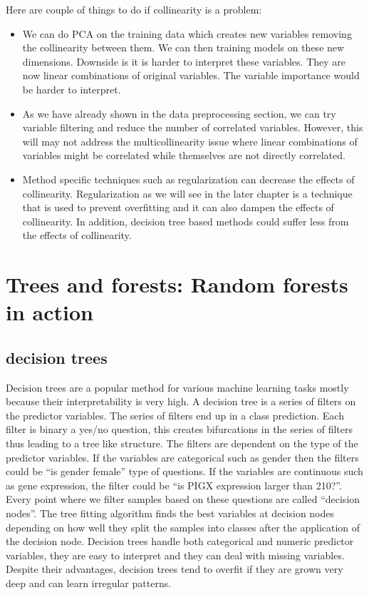 \documentclass[12pt,]{krantz}
\begin{document}
Here are couple of things to do if collinearity is a problem:

\begin{itemize}
\item
  We can do PCA on the training data which creates new variables removing the collinearity between them. We can then training models on these new dimensions. Downside is it is harder to interpret these variables. They are now linear combinations of original variables. The variable importance would be harder to interpret.
\item
  As we have already shown in the data preprocessing section, we can try variable filtering and reduce the number of correlated variables. However, this will may not address the multicollinearity issue where linear combinations of variables might be correlated while themselves are not directly correlated.
\item
  Method specific techniques such as regularization can decrease the effects of collinearity. Regularization as we will see in the later chapter is a technique that is used to prevent overfitting and it can also dampen the effects of collinearity. In addition, decision tree based methods could suffer less from the effects of collinearity.
\end{itemize}

\hypertarget{trees-and-forests-random-forests-in-action}{%
\section{Trees and forests: Random forests in action}\label{trees-and-forests-random-forests-in-action}}

\hypertarget{decision-trees}{%
\subsection{decision trees}\label{decision-trees}}

Decision trees are a popular method for various machine learning tasks mostly because their interpretability is very high. A decision tree is a series of filters on the predictor variables. The series of filters end up in a class prediction. Each filter is binary a yes/no question, this creates bifurcations in the series of filters thus leading to a tree like structure. The filters are dependent on the type of the predictor variables. If the variables are categorical such as gender then the filters could be ``is gender female'' type of questions. If the variables are continuous such as gene expression, the filter could be ``is PIGX expression larger than 210?''. Every point where we filter samples based on these questions are called ``decision nodes''. The tree fitting algorithm finds the best variables at decision nodes depending on how well they split the samples into classes after the application of the decision node. Decision trees handle both categorical and numeric predictor variables, they are easy to interpret and they can deal with missing variables. Despite their advantages, decision trees tend to overfit if they are grown very deep and can learn irregular patterns.
\end{document}

